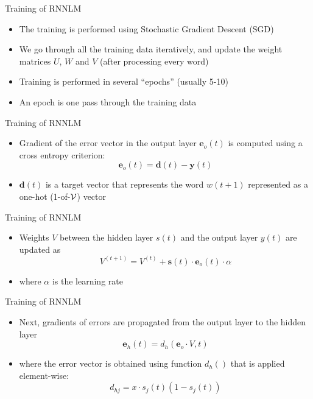 \begin{frame}{Training of RNNLM}
\begin{itemize}[<+->]
	\item The training is performed using Stochastic Gradient Descent (SGD)
	\item We go through all the training data iteratively, and update the weight matrices $U$, $W$ and $V$ (after processing every word)
	\item Training is performed in several ``epochs'' (usually 5-10)
	\item An epoch is one pass through the training data
\end{itemize}
\end{frame}

\begin{frame}{Training of RNNLM}
\begin{itemize}[<+->]
	\item Gradient of the error vector in the output layer $\mathbf{e}_o(t)$ is computed using a cross entropy criterion:
	\[ \mathbf{e}_o(t) = \mathbf{d}(t) - \mathbf{y}(t) \]
	\item $\mathbf{d}(t)$ is a target vector that represents the word $w(t+1)$ represented as a one-hot (1-of-${\cal V}$) vector
\end{itemize}
\end{frame}

\begin{frame}{Training of RNNLM}
\begin{itemize}[<+->]
	\item Weights $V$ between the hidden layer $s(t)$ and the output layer $y(t)$ are updated as
	\[ V^{(t+1)} = V^{(t)} + \mathbf{s}(t) \cdot \mathbf{e}_o(t) \cdot \alpha \]
	\item where $\alpha$ is the learning rate
\end{itemize}
\end{frame}

\begin{frame}{Training of RNNLM}
\begin{itemize}[<+->]
	\item Next, gradients of errors are propagated from the output layer to the hidden layer
	\[ \mathbf{e}_h(t) = d_h(\mathbf{e}_o \cdot V, t) \]
	\item where the error vector is obtained using function $d_h()$ that is applied element-wise:
	\[ d_{hj} = x \cdot s_j(t) (1 - s_j(t))\]
\end{itemize}
\end{frame}

